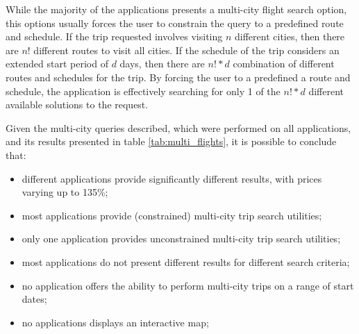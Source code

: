 While the majority of the applications presents a multi-city flight search option, this options usually forces the user to constrain the query to a predefined route and schedule. If the trip requested involves visiting $n$ different cities, then there are $n!$ different routes to visit all cities. If the schedule of the trip considers an extended start period of $d$ days, then there are $n!*d$ combination of different routes and schedules for the trip. By forcing the user to a predefined a route and schedule, the application is effectively searching for only 1 of the $n!*d$ different available solutions to the request. 

Given the multi-city queries described, which were performed on all applications, and its results presented in table \ref{tab:multi_flights}, it is possible to conclude that: 

\begin{itemize}[itemsep=0pt]
  \item different applications provide significantly different results, with prices varying up to 135\%;
  \item most applications provide (constrained) multi-city trip search utilities;
  \item only one application provides unconstrained multi-city trip search utilities;
  \item most applications do not present different results for different search criteria;
  \item no application offers the ability to perform multi-city trips on a range of start dates; 
  \item no applications displays an interactive map;
\end{itemize}

